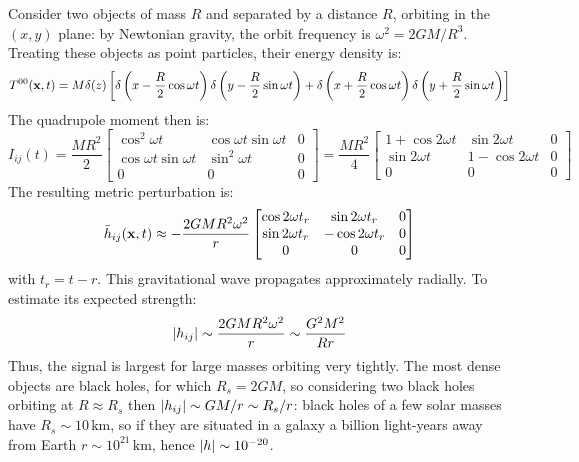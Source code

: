 \begin{example}
  Consider two objects of mass $ R $ and separated by a distance $ R $, orbiting in the $ (x,y) $ plane: by Newtonian gravity, the orbit frequency is $ \omega^2 = 2GM / R^3 $. Treating these objects as point particles, their energy density is:
  \begin{equation*}
    T^{00}(\mathbf{x},t) = M \delta(z) \left[ \delta \left( x - \frac{R}{2} \cos \omega t \right) \delta \left( y - \frac{R}{2} \sin \omega t \right) + \delta \left( x + \frac{R}{2} \cos \omega t \right) \delta \left( y + \frac{R}{2} \sin \omega t \right) \right]
  \end{equation*}
  The quadrupole moment then is:
  \begin{equation*}
    I_{ij} (t) = \frac{MR^2}{2}
    \begin{bmatrix}
      \cos^2 \omega t & \cos \omega t \sin \omega t & 0 \\
      \cos \omega t \sin \omega t & \sin^2 \omega t & 0 \\
      0 & 0 & 0
    \end{bmatrix}
    = \frac{MR^2}{4}
    \begin{bmatrix}
      1 + \cos 2 \omega t & \sin 2 \omega t & 0 \\
      \sin 2 \omega t & 1 - \cos 2 \omega t & 0 \\
      0 & 0 & 0
    \end{bmatrix}
  \end{equation*}
  The resulting metric perturbation is:
  \begin{equation*}
    \bar{h}_{ij}(\mathbf{x},t) \approx - \frac{2GMR^2 \omega^2}{r}
    \begin{bmatrix}
      \cos 2 \omega t_r & \sin 2 \omega t_r & 0 \\
      \sin 2 \omega t_r & - \cos 2 \omega t_r & 0 \\
      0 & 0 & 0
    \end{bmatrix}
  \end{equation*}
  with $ t_r = t - r $. This gravitational wave propagates approximately radially. To estimate its expected strength:
  \begin{equation*}
    \left\lvert h_{ij}\right\rvert \sim \frac{2GMR^2 \omega^2}{r} \sim \frac{G^2 M^2}{Rr}
  \end{equation*}
  Thus, the signal is largest for large masses orbiting very tightly. The most dense objects are black holes, for which $ R_s = 2GM $, so considering two black holes orbiting at $ R \approx R_s $ then $ \left\lvert h_{ij}\right\rvert \sim GM / r \sim R_s / r $: black holes of a few solar masses have $ R_s \sim 10\,\text{km} $, so if they are situated in a galaxy a billion light-years away from Earth $ r \sim 10^{21}\,\text{km} $, hence $ \left\lvert h\right\rvert \sim 10^{-20} $.
\end{example}


